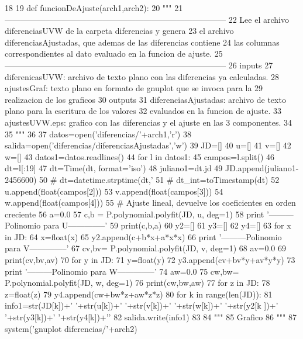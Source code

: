 \begin{DoxyCode}
18 
19 def funcionDeAjuste(arch1,arch2):
20     """
21    
       ---------------------------------------------------------------------------------
22     Lee el archivo diferenciasUVW de la carpeta diferencias y genera 
23     el archivo diferenciasAjustadas, que ademas de las diferencias contiene
24     las columnas correspondientes al dato evaluado en la funcion de ajuste. 
25    
       ---------------------------------------------------------------------------------
26     inputs 
27         diferenicasUVW:     archivo de texto plano con las diferencias ya
       calculadas.
28         ajustesGraf:        texto plano en formato de gnuplot que se invoca
       para la 
29                             realizacion de los graficos
30     outputs
31         diferenciasAjustadas: archivo de texto plano para la escritura de los
       valores
32                               evaluados en la funcion de ajuste.
33         ajustesUVW.eps: grafico con las diferencias y el ajuste en las 3
       componentes.
34         
35     """
36     
37     datos=open('diferencias/'+arch1,'r')
38     salida=open('diferencias/diferenciasAjustadas','w')
39     JD=[]
40     u=[]
41     v=[]
42     w=[]
43     datos1=datos.readlines()
44     for l in datos1:
45         campos=l.split()
46         dt=l[:19]
47         dt=Time(dt, format='iso')
48         juliano1=dt.jd
49         JD.append(juliano1-2456600)
50 #         dt=datetime.strptime(dt,'%
51 #         dt_int=toTimestamp(dt)
52         u.append(float(campos[2]))
53         v.append(float(campos[3]))
54         w.append(float(campos[4]))
55     # Ajuste lineal, devuelve los coeficientes en orden creciente
56     a=0.0
57     c,b = P.polynomial.polyfit(JD, u, deg=1)
58     print '---------Polinomio para U--------------'
59     print(c,b,a)
60     y2=[]
61     y3=[]
62     y4=[]
63     for x in JD:
64         x=float(x)
65         y2.append(c+b*x+a*x*x)
66     print '---------Polinomio para V--------------'
67     cv,bv= P.polynomial.polyfit(JD, v, deg=1)
68     av=0.0
69     print(cv,bv,av)
70     for y in JD:
71         y=float(y)
72         y3.append(cv+bv*y+av*y*y)
73     print '---------Polinomio para W--------------'
74     aw=0.0
75     cw,bw= P.polynomial.polyfit(JD, w, deg=1)
76     print(cw,bw,aw)
77     for z in JD:
78         z=float(z)
79         y4.append(cw+bw*z+aw*z*z)
80     for k in range(len(JD)):
81         info1=str(JD[k])+' '+str(u[k])+' '+str(v[k])+' '+str(w[k])+' '+str(y2[k
      ])+' '+str(y3[k])+' '+str(y4[k])+'\n'
82         salida.write(info1)
83         
84     """
85     Grafico
86     """   
87     system('gnuplot diferencias/'+arch2)
    
\end{DoxyCode}
